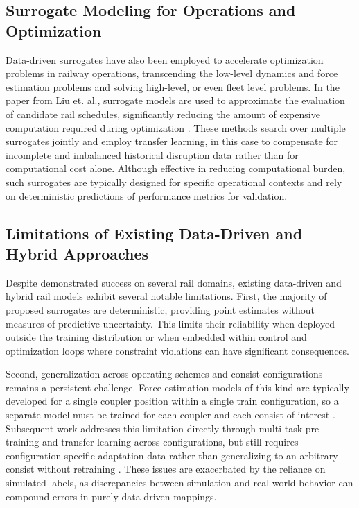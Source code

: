 \subsection{Surrogate Modeling for Operations and Optimization}

Data-driven surrogates have also been employed to accelerate optimization problems in railway operations, transcending the low-level dynamics and force estimation problems and solving high-level, or even fleet level problems. In the paper from Liu et. al., surrogate models are used to approximate the evaluation of candidate rail schedules, significantly reducing the amount of expensive computation required during optimization \cite{liu_rescheduling_surrogate}. These methods search over multiple surrogates jointly and employ transfer learning, in this case to compensate for incomplete and imbalanced historical disruption data rather than for computational cost alone. Although effective in reducing computational burden, such surrogates are typically designed for specific operational contexts and rely on deterministic predictions of performance metrics for validation.

\subsection{Limitations of Existing Data-Driven and Hybrid Approaches}
\label{sec:rail_data_driven_limits}

Despite demonstrated success on several rail domains, existing data-driven and hybrid rail models exhibit several notable limitations. First, the majority of proposed surrogates are deterministic, providing point estimates without measures of predictive uncertainty. This limits their reliability when deployed outside the training distribution or when embedded within control and optimization loops where constraint violations can have significant consequences.

Second, generalization across operating schemes and consist configurations remains a persistent challenge. Force-estimation models of this kind are typically developed for a single coupler position within a single train configuration, so a separate model must be trained for each coupler and each consist of interest \cite{zhang_in_train_forces}. Subsequent work addresses this limitation directly through multi-task pre-training and transfer learning across configurations, but still requires configuration-specific adaptation data rather than generalizing to an arbitrary consist without retraining \cite{intrainnet}. These issues are exacerbated by the reliance on simulated labels, as discrepancies between simulation and real-world behavior can compound errors in purely data-driven mappings.

